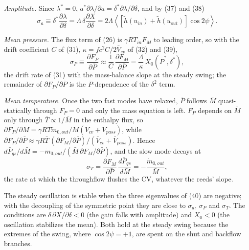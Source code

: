 \documentclass[11pt]{article}
\begin{document}
\emph{Amplitude.} Since $\lambda^* = 0$, $a^*\partial\lambda/\partial a = \delta^*\partial\lambda/\partial\delta$, and by (37) and (38)
\begin{equation}
\sigma_a \equiv \delta^*\frac{\partial\lambda}{\partial\delta} = \Lambda\,\delta\frac{\partial X}{\partial\delta} = 2\Lambda\left\langle\left[\tilde h(u_{in}) + \tilde h(u_{out})\right]\cos 2\psi\right\rangle . \tag{41}
\end{equation}

\emph{Mean pressure.} The flux term of (26) is $\gamma RT_{in}F_M$ to leading order, so with the drift coefficient $C$ of (31), $\kappa = fc^2C/2\bar V_{cv}$ of (32) and (39),
\begin{equation}
\sigma_P \equiv \frac{\partial F_P}{\partial\bar P} \approx \frac{1}{C}\,\frac{\partial F_M}{\partial\bar P} = \frac{\Lambda}{\kappa}\,X_0(\bar P^*,\delta^*) , \tag{42}
\end{equation}
the drift rate of (31) with the mass-balance slope at the steady swing; the remainder of $\partial F_P/\partial\bar P$ is the $\bar P$-dependence of the $\delta^2$ term.

\emph{Mean temperature.} Once the two fast modes have relaxed, $\bar P$ follows $\bar M$ quasi-statically through $F_P = 0$ and only the mass equation is left. $F_P$ depends on $\bar M$ only through $\bar T \propto 1/\bar M$ in the enthalpy flux, so $\partial F_P/\partial\bar M = \gamma R\bar T\dot m_{0,out}/\bar M(\bar V_{cv} + \bar V_{pass})$, while $\partial F_P/\partial\bar P \approx \gamma R\bar T\,(\partial F_M/\partial\bar P)/(\bar V_{cv} + \bar V_{pass})$. Hence $d\bar P_{qs}/d\bar M = -\dot m_{0,out}/(\bar M\,\partial F_M/\partial\bar P)$, and the slow mode decays at
\begin{equation}
\sigma_T = \frac{\partial F_M}{\partial\bar P}\,\frac{d\bar P_{qs}}{d\bar M} = -\frac{\dot m_{0,out}}{\bar M} , \tag{43}
\end{equation}
the rate at which the throughflow flushes the CV, whatever the reeds' slope.

The steady oscillation is stable when the three eigenvalues of (40) are negative; with the decoupling of the symmetric point they are close to $\sigma_a$, $\sigma_P$ and $\sigma_T$. The conditions are $\delta\,\partial X/\partial\delta < 0$ (the gain falls with amplitude) and $X_0 < 0$ (the oscillation stabilizes the mean). Both hold at the steady swing because the extremes of the swing, where $\cos 2\psi = +1$, are spent on the shut and backflow branches.
\end{document}
